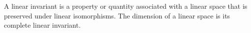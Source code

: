 A linear invariant is a property or quantity associated with a linear space that is preserved under linear isomorphisms. The dimension of a linear space is its complete linear invariant.
